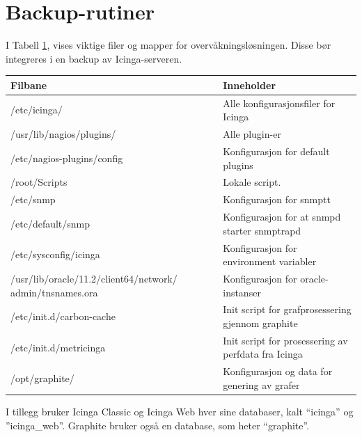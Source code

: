 \section{Backup-rutiner}
I Tabell \ref{backup}, vises viktige filer og mapper for overvåkningsløsningen. Disse bør integreres i en backup av Icinga-serveren.
\begin{table} \label{backup}
\begin{center}
\begin{tabular}{| p{8cm} | p{8cm} |}
 \hline
        \textbf{Filbane} & \textbf{Inneholder}
	\\ \hline
	/etc/icinga/ & Alle konfigurasjonsfiler for Icinga \\ \hline
	/usr/lib/nagios/plugins/ & Alle plugin-er \\ \hline
	/etc/nagios-plugins/config & Konfigurasjon for default plugins \\ \hline
	/root/Scripts & Lokale script. \\ \hline
	/etc/snmp & Konfigurasjon for snmptt \\ \hline
	/etc/default/snmp & Konfigurasjon for at snmpd starter snmptrapd \\ \hline
	/etc/sysconfig/icinga & Konfigurasjon for environment variabler \\ \hline
	/usr/lib/oracle/11.2/client64/network/
	admin/tnsnames.ora & Konfigurasjon for oracle-instanser \\ \hline
	/etc/init.d/carbon-cache & Init script for grafprosessering gjennom graphite \\ \hline
	/etc/init.d/metricinga & Init script for prosessering av perfdata fra Icinga \\ \hline
	/opt/graphite/ & Konfigurasjon og data for genering av grafer  \\ \hline
\end{tabular}
\end{center}
\end{table}
I tillegg bruker Icinga Classic og Icinga Web hver sine databaser, kalt ``icinga'' og ''icinga\_web''. Graphite bruker også en database, som heter ``graphite''.


